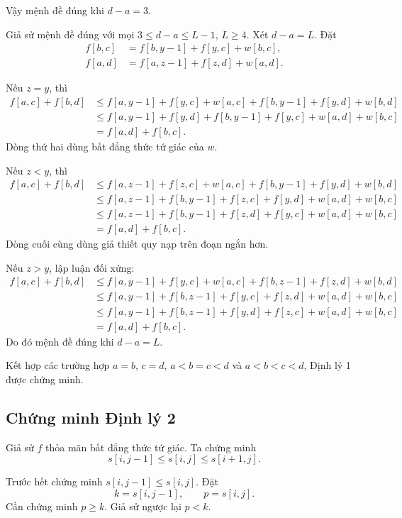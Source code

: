 \documentclass[11pt]{article}
\begin{document}
Vậy mệnh đề đúng khi $d-a=3$.

Giả sử mệnh đề đúng với mọi $3\le d-a\le L-1$, $L\ge4$. Xét $d-a=L$. Đặt
\[
\begin{aligned}
  f[b,c]&=f[b,y-1]+f[y,c]+w[b,c],\\
  f[a,d]&=f[a,z-1]+f[z,d]+w[a,d].
\end{aligned}
\]

Nếu $z=y$, thì
\[
\begin{aligned}
  f[a,c]+f[b,d]
  &\le f[a,y-1]+f[y,c]+w[a,c]
       +f[b,y-1]+f[y,d]+w[b,d]\\
  &\le f[a,y-1]+f[y,d]+f[b,y-1]+f[y,c]
       +w[a,d]+w[b,c]\\
  &=f[a,d]+f[b,c].
\end{aligned}
\]
Dòng thứ hai dùng bất đẳng thức tứ giác của $w$.

Nếu $z<y$, thì
\[
\begin{aligned}
  f[a,c]+f[b,d]
  &\le f[a,z-1]+f[z,c]+w[a,c]
       +f[b,y-1]+f[y,d]+w[b,d]\\
  &\le f[a,z-1]+f[b,y-1]+f[z,c]+f[y,d]
       +w[a,d]+w[b,c]\\
  &\le f[a,z-1]+f[b,y-1]+f[z,d]+f[y,c]
       +w[a,d]+w[b,c]\\
  &=f[a,d]+f[b,c].
\end{aligned}
\]
Dòng cuối cùng dùng giả thiết quy nạp trên đoạn ngắn hơn.

Nếu $z>y$, lập luận đối xứng:
\[
\begin{aligned}
  f[a,c]+f[b,d]
  &\le f[a,y-1]+f[y,c]+w[a,c]
       +f[b,z-1]+f[z,d]+w[b,d]\\
  &\le f[a,y-1]+f[b,z-1]+f[y,c]+f[z,d]
       +w[a,d]+w[b,c]\\
  &\le f[a,y-1]+f[b,z-1]+f[y,d]+f[z,c]
       +w[a,d]+w[b,c]\\
  &=f[a,d]+f[b,c].
\end{aligned}
\]
Do đó mệnh đề đúng khi $d-a=L$.

Kết hợp các trường hợp $a=b$, $c=d$, $a<b=c<d$ và $a<b<c<d$, Định lý 1 được
chứng minh.

\subsection*{Chứng minh Định lý 2}

Giả sử $f$ thỏa mãn bất đẳng thức tứ giác. Ta chứng minh
\[
  s[i,j-1]\le s[i,j]\le s[i+1,j].
\]

Trước hết chứng minh $s[i,j-1]\le s[i,j]$. Đặt
\[
  k=s[i,j-1],\qquad p=s[i,j].
\]
Cần chứng minh $p\ge k$. Giả sử ngược lại $p<k$.
\end{document}
